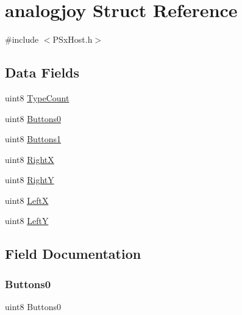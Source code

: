 \hypertarget{structanalogjoy}{}\section{analogjoy Struct Reference}
\label{structanalogjoy}


{\ttfamily \#include $<$P\+Sx\+Host.\+h$>$}

\subsection*{Data Fields}
\begin{DoxyCompactItemize}
\item 
uint8 \mbox{\hyperlink{structanalogjoy_af8950e4872b4b4b5dd2b837ac45a0603}{Type\+Count}}
\item 
uint8 \mbox{\hyperlink{structanalogjoy_a0d9f38dcaa6d84c7fc78d434b839f259}{Buttons0}}
\item 
uint8 \mbox{\hyperlink{structanalogjoy_a17ebb8fd1844de7d6545c9f96194d300}{Buttons1}}
\item 
uint8 \mbox{\hyperlink{structanalogjoy_a559c5161612b7e270912d743026202fd}{RightX}}
\item 
uint8 \mbox{\hyperlink{structanalogjoy_a181876a6a15edd540d9d18e929ed0c1f}{RightY}}
\item 
uint8 \mbox{\hyperlink{structanalogjoy_a68338607896f53b8c5abc93651ad88e9}{LeftX}}
\item 
uint8 \mbox{\hyperlink{structanalogjoy_a5ca737141afa00b178178e73c6f50770}{LeftY}}
\end{DoxyCompactItemize}


\subsection{Field Documentation}
\mbox{\label{structanalogjoy_a0d9f38dcaa6d84c7fc78d434b839f259}} 
\subsubsection{\texorpdfstring{Buttons0}{Buttons0}}
{\footnotesize\ttfamily uint8 Buttons0}

\mbox{\label{structanalogjoy_a17ebb8fd1844de7d6545c9f96194d300}} 
